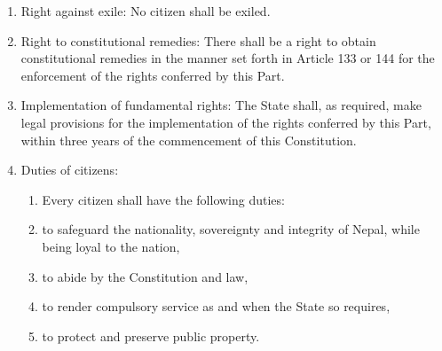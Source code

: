 \begin{questions}
\begin{solution}
\begin{enumerate}
\item Right against exile: No citizen shall be exiled.
\item Right to constitutional remedies: There shall be a right to obtain constitutional remedies in the manner set forth in Article 133 or 144 for the enforcement of the rights conferred by this Part.
\item Implementation of fundamental rights: The State shall, as required, make legal provisions for the implementation of the rights conferred by this Part, within three years of the commencement of this Constitution.
\item Duties of citizens: 
\begin{enumerate}
    \item[] Every citizen shall have the following duties:
    \item to safeguard the nationality, sovereignty and integrity of Nepal, while being loyal to the nation,
    \item to abide by the Constitution and law,
    \item to render compulsory service as and when the State so requires,
    \item to protect and preserve public property.
\end{enumerate}
\end{enumerate}
  \end{solution}

\end{questions}